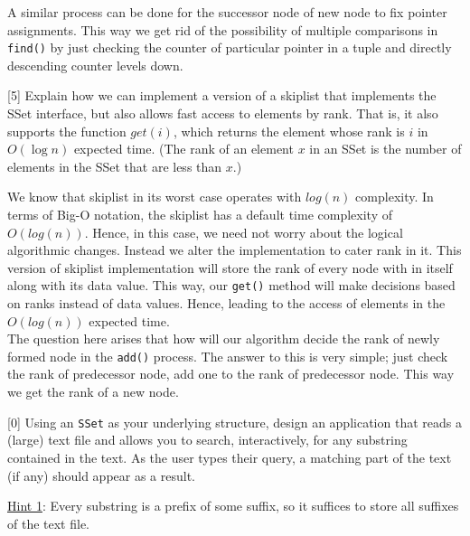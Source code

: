 \documentclass[addpoints]{exam}
\begin{document}
\begin{questions}
\begin{solution}
			
			A similar process can be done for the successor node of new node to fix pointer assignments. This way we get rid of the possibility of multiple comparisons in {\tt find()} by just checking the counter of particular pointer in a tuple and directly descending counter levels down. 
			
			
		\end{solution}
\pagebreak
		
		[5]
		Explain how we can implement a version of a skiplist that implements the SSet interface, but also allows fast access to elements by rank. That is, it also supports the function $get(i)$, which returns the element whose rank is $i$ in $O(\log n)$ expected time. (The rank of an element $x$ in an SSet is the number of elements in the SSet that are less than $x$.)
		\begin{solution}
			We know that skiplist in its worst case operates with $log(n)$ complexity. In terms of Big-O notation, the skiplist has a default time complexity of $O(log(n))$. Hence, in this case, we need not worry about the logical algorithmic changes. Instead we alter the implementation to cater rank in it. This version of skiplist implementation will store the rank of every node with in itself along with its data value. This way, our {\tt get()} method will make decisions based on ranks instead of data values. Hence, leading to the access of elements in the $O(log(n))$ expected time. \\
			The question here arises that how will our algorithm decide the rank of newly formed node in the {\tt add()} process. The answer to this is very simple; just check the rank of predecessor node, add one to the rank of predecessor node. This way we get the rank of a new node. 
		\end{solution}
\pagebreak
		
		[0]
		Using an {\tt SSet} as your underlying structure, design an application that reads a (large) text file and allows you to search, interactively, for any substring contained in the text. As the user types their query, a matching part of the text (if any) should appear as a result.
		
		\noindent\underline{Hint 1}: Every substring is a prefix of some suffix, so it suffices to store all suffixes of the text file.
		

\end{questions}
\end{document}

